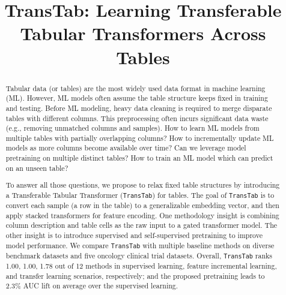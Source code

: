 \title{TransTab: Learning Transferable Tabular Transformers Across Tables}

\begin{abstract}
Tabular data (or tables) are the most widely used data format in machine learning (ML). However, ML models often assume the table structure keeps fixed in training and testing. Before ML modeling, heavy data cleaning is required to merge disparate tables with different columns. This preprocessing often incurs significant data waste (e.g., removing unmatched columns and samples). How to learn ML models from multiple tables with partially overlapping columns? How to incrementally update ML models as more columns become available over time? Can we leverage model pretraining on multiple distinct tables? How to train an ML model which can predict on an unseen table? 

To answer all those questions, we propose to relax fixed table structures by introducing a Transferable Tabular Transformer (\texttt{TransTab}) for tables. The goal of \texttt{TransTab} is to convert each sample (a row in the table) to a generalizable embedding vector, and then apply stacked transformers for feature encoding. One methodology insight is combining column description and table cells as the raw input to a gated transformer model. The other insight is to introduce supervised and self-supervised pretraining to improve model performance. We compare \texttt{TransTab} with multiple baseline methods on diverse benchmark datasets and five oncology clinical trial datasets. Overall, \texttt{TransTab} ranks 1.00, 1.00, 1.78 out of 12 methods in supervised learning, feature incremental learning, and transfer learning scenarios, respectively; and the proposed pretraining leads to 2.3\% AUC lift on average over the supervised learning.
\end{abstract}


